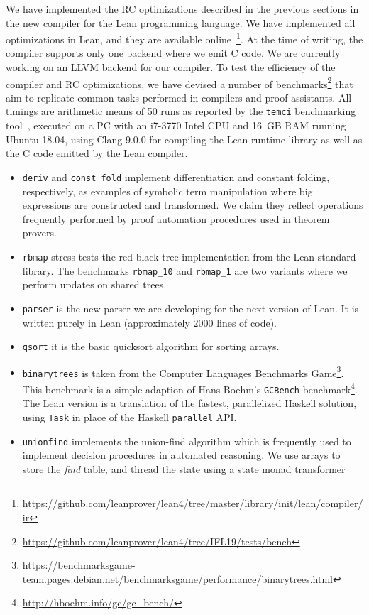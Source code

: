 We have implemented the RC optimizations described in the previous
sections in the new compiler for the Lean programming language.
We have implemented all optimizations in Lean, and they are available
online~\footnote{\url{https://github.com/leanprover/lean4/tree/master/library/init/lean/compiler/ir}}.
At the time of writing, the compiler supports only one backend where we emit
C code. We are currently working on an LLVM backend for
our compiler. To test the efficiency of the compiler and RC
optimizations, we have devised a number of benchmarks\footnote{\url{https://github.com/leanprover/lean4/tree/IFL19/tests/bench}}
that aim to replicate common tasks performed in compilers and proof assistants.
All timings are arithmetic means of 50 runs as reported by the \texttt{temci}
benchmarking tool~\cite{bechberger16bachelorarbeit},
executed on a PC with an i7-3770 Intel CPU and 16~GB RAM running Ubuntu 18.04,
using Clang 9.0.0 for compiling the Lean runtime library
as well as the C code emitted by the Lean compiler.
\begin{itemize}
\item \verb!deriv! and \verb!const_fold! implement
  differentiation and constant folding, respectively, as examples of symbolic
  term manipulation where big expressions are constructed and transformed.
  We claim they reflect operations frequently performed by proof automation procedures used in theorem provers.
\item \verb!rbmap! stress tests the red-black tree implementation from the Lean standard library.
  The benchmarks \verb!rbmap_10! and \verb!rbmap_1! are two variants where
  we perform updates on shared trees.
\item \verb!parser! is the new parser we are developing for the next version of
  Lean. It is written purely in Lean (approximately $2000$ lines of code).
\item \verb!qsort! it is the basic quicksort algorithm for sorting arrays.
\item \verb!binarytrees! is taken from the Computer Languages Benchmarks
Game\footnote{\url{https://benchmarksgame-team.pages.debian.net/benchmarksgame/performance/binarytrees.html}}.
This benchmark is a simple adaption of Hans Boehm's \texttt{GCBench} benchmark\footnote{\url{http://hboehm.info/gc/gc_bench/}}.
The Lean version is a translation of the fastest, parallelized Haskell solution,
using \texttt{Task} in place of the Haskell \texttt{parallel} API.
\item \verb!unionfind! implements the union-find algorithm which is frequently used
  to implement decision procedures in automated reasoning. We use arrays to store
  the \emph{find} table, and thread the state using a state monad transformer
\end{itemize}

